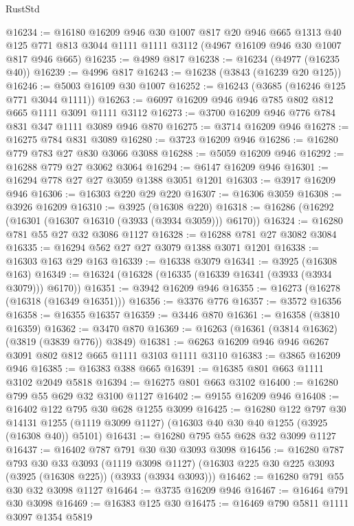 \begin{lexlean}{RustStd}
\begin{coremodule}
@16234 := @16180
    @16209
    @946
    @30
    @1007
    @817
    @20
    @946
    @665
    @1313
    @40
    @125
    @771
    @813
    @3044
    @1111
    @1111
    @3112
    (@4967 @16109 @946 @30 @1007 @817 @946 @665)
@16235 := @4989 @817
@16238 := @16234 (@4977 (@16235 @40))
@16239 := @4996 @817
@16243 := @16238 (@3843 (@16239 @20 @125))
@16246 := @5003 @16109 @30 @1007
@16252 := @16243 (@3685 (@16246 @125 @771 @3044 @1111))
@16263 := @6097 @16209 @946 @946 @785 @802 @812 @665 @1111 @3091 @1111 @3112
@16273 := @3700 @16209 @946 @776 @784 @831 @347 @1111 @3089 @946 @870
@16275 := @3714 @16209 @946
@16278 := @16275 @784 @831 @3089
@16280 := @3723 @16209 @946
@16286 := @16280 @779 @783 @27 @830 @3066 @3088
@16288 := @5059 @16209 @946
@16292 := @16288 @779 @27 @3062 @3064
@16294 := @6147 @16209 @946
@16301 := @16294 @778 @27 @27 @3059 @1388 @3051 @1201
@16303 := @3917 @16209 @946
@16306 := @16303 @220 @29 @220
@16307 := @16306 @3059
@16308 := @3926 @16209
@16310 := @3925 (@16308 @220)
@16318 := @16286 (@16292 (@16301 (@16307 @16310 (@3933 (@3934 @3059))) @6170))
@16324 := @16280 @781 @55 @27 @32 @3086 @1127
@16328 := @16288 @781 @27 @3082 @3084
@16335 := @16294 @562 @27 @27 @3079 @1388 @3071 @1201
@16338 := @16303 @163 @29 @163
@16339 := @16338 @3079
@16341 := @3925 (@16308 @163)
@16349 := @16324 (@16328 (@16335 (@16339 @16341 (@3933 (@3934 @3079))) @6170))
@16351 := @3942 @16209 @946
@16355 := @16273 (@16278 (@16318 (@16349 @16351)))
@16356 := @3376 @776
@16357 := @3572 @16356
@16358 := @16355 @16357
@16359 := @3446 @870
@16361 := @16358 (@3810 @16359)
@16362 := @3470 @870
@16369 := @16263 (@16361 (@3814 @16362) (@3819 (@3839 @776)) @3849)
@16381 := @6263 @16209 @946 @946 @6267 @3091 @802 @812 @665 @1111 @3103 @1111 @3110
@16383 := @3865 @16209 @946
@16385 := @16383 @388 @665
@16391 := @16385 @801 @663 @1111 @3102 @2049 @5818
@16394 := @16275 @801 @663 @3102
@16400 := @16280 @799 @55 @629 @32 @3100 @1127
@16402 := @9155 @16209 @946
@16408 := @16402 @122 @795 @30 @628 @1255 @3099
@16425 := @16280
    @122
    @797
    @30
    @14131
    @1255
    (@1119 @3099 @1127)
    (@16303 @40 @30 @40 @1255 (@3925 (@16308 @40)) @5101)
@16431 := @16280 @795 @55 @628 @32 @3099 @1127
@16437 := @16402 @787 @791 @30 @30 @3093 @3098
@16456 := @16280
    @787
    @793
    @30
    @33
    @3093
    (@1119 @3098 @1127)
    (@16303 @225 @30 @225 @3093 (@3925 (@16308 @225)) (@3933 (@3934 @3093)))
@16462 := @16280 @791 @55 @30 @32 @3098 @1127
@16464 := @3735 @16209 @946
@16467 := @16464 @791 @30 @3098
@16469 := @16383 @125 @30
@16475 := @16469 @790 @5811 @1111 @3097 @1354 @5819

\end{coremodule}
\end{lexlean}
